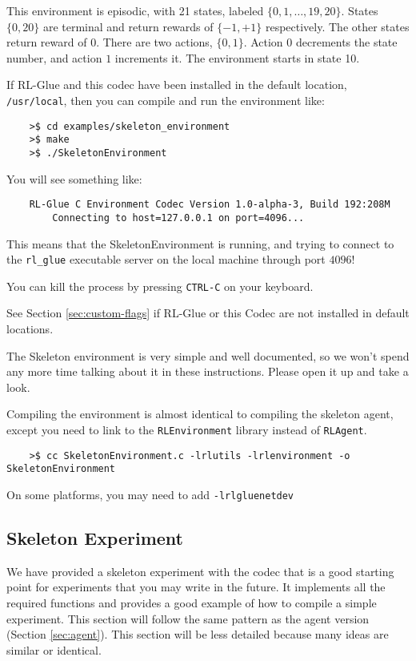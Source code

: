 \documentclass[11pt]{article}
\begin{document}
This environment is episodic, with 21 states, labeled $\{0, 1,\ldots,19,20\}$. States $\{0, 20\}$ are terminal and return rewards of $\{-1, +1\}$ respectively.  The other states return reward of $0$.
There are two actions, $\{0, 1\}$.  Action $0$ decrements the state number, and action $1$ increments it. The environment starts in state 10.

If RL-Glue and this codec have been installed in the default location, \texttt{/usr/local}, then you can compile and run the environment like:
\begin{verbatim}
	>$ cd examples/skeleton_environment
	>$ make
	>$ ./SkeletonEnvironment
\end{verbatim}

You will see something like:
\begin{verbatim}
	RL-Glue C Environment Codec Version 1.0-alpha-3, Build 192:208M
		Connecting to host=127.0.0.1 on port=4096...
\end{verbatim}

This means that the SkeletonEnvironment is running, and trying to connect to the \texttt{rl\_glue} executable server on the local machine through port $4096$! 

You can kill the process by pressing \texttt{CTRL-C} on your keyboard.

See Section \ref{sec:custom-flags} if RL-Glue or this Codec are not installed in default locations.

The Skeleton environment is very simple and well documented, so we won't spend any more time talking about it in these instructions.
Please open it up and take a look.

Compiling the environment is almost identical to compiling the skeleton agent, except you need to link to the \texttt{RLEnvironment} library instead of \texttt{RLAgent}.
\begin{verbatim}
	>$ cc SkeletonEnvironment.c -lrlutils -lrlenvironment -o SkeletonEnvironment
\end{verbatim}

On some platforms, you may need to add \texttt{-lrlgluenetdev}

\subsection{Skeleton Experiment}
We have provided a skeleton experiment with the codec that is a good starting point for experiments that you may write in the future.
It implements all the required functions and provides a good example of how to compile a simple experiment.  This section will follow the same 
pattern as the agent version (Section \ref{sec:agent}).  This section will be less detailed because many ideas are similar or identical.
\end{document}
